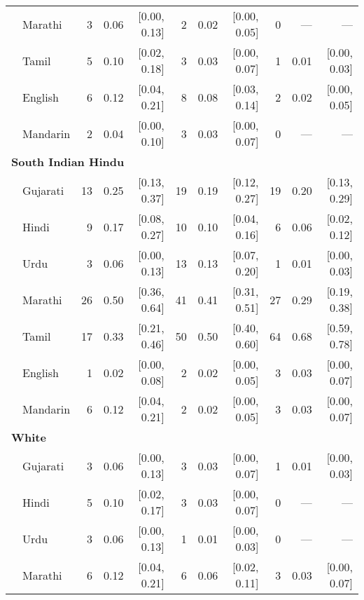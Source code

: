 \begin{table}[t]
\begin{footnotesize}
\begin{tabular}{p{.1in}lrrrrrrrrr}
 & Marathi & 3 & 0.06 & [0.00, 0.13] & 2 & 0.02 & [0.00, 0.05] & 0 & --- & ---\\

 & Tamil & 5 & 0.10 & [0.02, 0.18] & 3 & 0.03 & [0.00, 0.07] & 1 & 0.01 & [0.00, 0.03]\\

 & English & 6 & 0.12 & [0.04, 0.21] & 8 & 0.08 & [0.03, 0.14] & 2 & 0.02 & [0.00, 0.05]\\

& Mandarin & 2 & 0.04 & [0.00, 0.10] & 3 & 0.03 & [0.00, 0.07] & 0 & --- & ---\\
\midrule
\multicolumn{11}{l}{\textbf{South Indian Hindu}}\\
& Gujarati & 13 & 0.25 & [0.13, 0.37] & 19 & 0.19 & [0.12, 0.27] & 19 & 0.20 & [0.13, 0.29]\\

 & Hindi & 9 & 0.17 & [0.08, 0.27] & 10 & 0.10 & [0.04, 0.16] & 6 & 0.06 & [0.02, 0.12]\\

 & Urdu & 3 & 0.06 & [0.00, 0.13] & 13 & 0.13 & [0.07, 0.20] & 1 & 0.01 & [0.00, 0.03]\\

 & Marathi & 26 & 0.50 & [0.36, 0.64] & 41 & 0.41 & [0.31, 0.51] & 27 & 0.29 & [0.19, 0.38]\\

 & Tamil & 17 & 0.33 & [0.21, 0.46] & 50 & 0.50 & [0.40, 0.60] & 64 & 0.68 & [0.59, 0.78]\\

 & English & 1 & 0.02 & [0.00, 0.08] & 2 & 0.02 & [0.00, 0.05] & 3 & 0.03 & [0.00, 0.07]\\

 & Mandarin & 6 & 0.12 & [0.04, 0.21] & 2 & 0.02 & [0.00, 0.05] & 3 & 0.03 & [0.00, 0.07]\\

\midrule
\multicolumn{11}{l}{\textbf{White}}\\
  & Gujarati & 3 & 0.06 & [0.00, 0.13] & 3 & 0.03 & [0.00, 0.07] & 1 & 0.01 & [0.00, 0.03]\\

 & Hindi & 5 & 0.10 & [0.02, 0.17] & 3 & 0.03 & [0.00, 0.07] & 0 & --- & ---\\

 & Urdu & 3 & 0.06 & [0.00, 0.13] & 1 & 0.01 & [0.00, 0.03] & 0 & --- & ---\\

 & Marathi & 6 & 0.12 & [0.04, 0.21] & 6 & 0.06 & [0.02, 0.11] & 3 & 0.03 & [0.00, 0.07]\\


\end{tabular}
\end{footnotesize}
\end{table}

